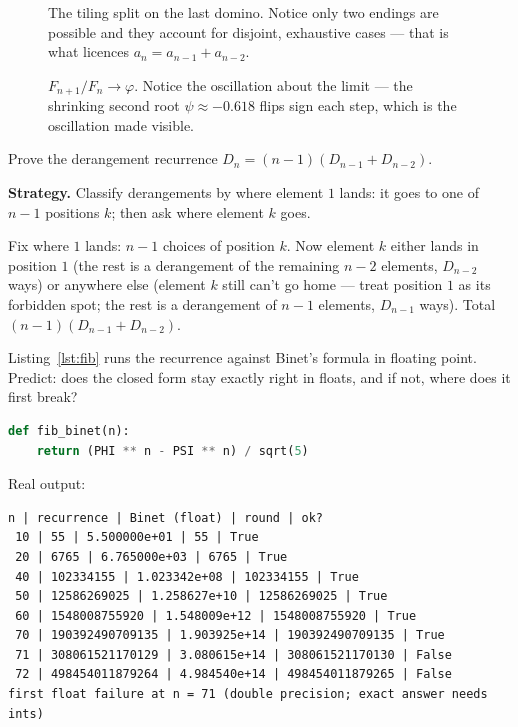 \begin{figure}[ht]\centering

\caption{The tiling split on the last domino. Notice only two endings
are possible and they account for disjoint, exhaustive cases ---
that is what licences $a_n = a_{n-1} + a_{n-2}$.}
\label{fig:tiling}
\end{figure}

\begin{figure}[ht]\centering

\caption{$F_{n+1}/F_n \to \varphi$. Notice the oscillation about the
limit --- the shrinking second root $\psi \approx -0.618$ flips sign
each step, which is the oscillation made visible.}
\label{fig:ratio}
\end{figure}

\begin{example}\label{ex:derrec}
Prove the derangement recurrence $D_n = (n-1)(D_{n-1} + D_{n-2})$.
\par\smallskip
\textbf{Strategy.} Classify derangements by where element $1$ lands:
it goes to one of $n-1$ positions $k$; then ask where element $k$ goes.
\par\smallskip
\begin{solution}
Fix where $1$ lands: $n-1$ choices of position $k$. Now element $k$
either lands in position $1$ (the rest is a derangement of the
remaining $n-2$ elements, $D_{n-2}$ ways) or anywhere else (element $k$
still can't go home --- treat position $1$ as its forbidden spot; the
rest is a derangement of $n-1$ elements, $D_{n-1}$ ways). Total
$(n-1)(D_{n-1} + D_{n-2})$.
\end{solution}
\end{example}

\begin{checkpoint}
Listing~\ref{lst:fib} runs the recurrence against Binet's formula in
floating point. Predict: does the closed form stay exactly right in
floats, and if not, where does it first break?
\end{checkpoint}

\begin{lstlisting}[language=Python,caption={\texttt{fib\_closed.py}:
recurrence vs Binet --- watch the floats (script in
\texttt{code/fib\_closed.py}).},label={lst:fib}]
def fib_binet(n):
    return (PHI ** n - PSI ** n) / sqrt(5)
\end{lstlisting}
Real output:
\begin{lstlisting}[numbers=none]
n | recurrence | Binet (float) | round | ok?
 10 | 55 | 5.500000e+01 | 55 | True
 20 | 6765 | 6.765000e+03 | 6765 | True
 40 | 102334155 | 1.023342e+08 | 102334155 | True
 50 | 12586269025 | 1.258627e+10 | 12586269025 | True
 60 | 1548008755920 | 1.548009e+12 | 1548008755920 | True
 70 | 190392490709135 | 1.903925e+14 | 190392490709135 | True
 71 | 308061521170129 | 3.080615e+14 | 308061521170130 | False
 72 | 498454011879264 | 4.984540e+14 | 498454011879265 | False
first float failure at n = 71 (double precision; exact answer needs ints)
\end{lstlisting}

